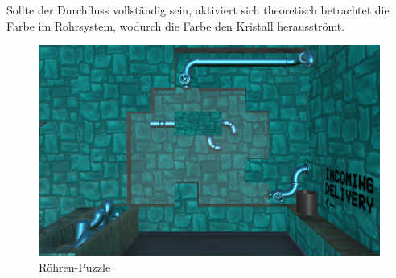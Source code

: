 Sollte der Durchfluss vollständig sein, aktiviert sich theoretisch betrachtet die Farbe im Rohrsystem, wodurch die Farbe den Kristall herausströmt.
\begin{figure}[h]
	\centering
	\includegraphics[width=\textwidth/2]{Pictures/Roehren}
	\caption{Röhren-Puzzle}
	\label{fig:cyan}
\end{figure}\\

